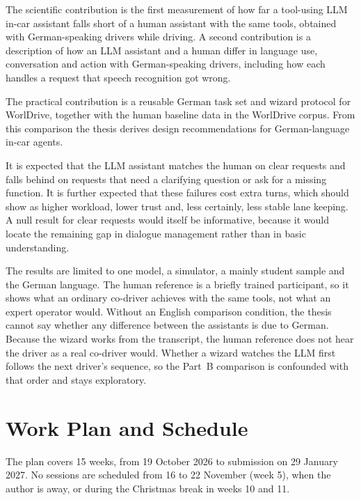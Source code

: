 \documentclass[
    a4paper,
    11pt,
    DIV=11,
    bigheadings,
    idxtotoc,
    listof=totoc,
    bibtotoc,
    halfparskip,
    cleardoubleempty,
    openright,
    oneside
]{scrartcl}
\begin{document}
The scientific contribution is the first measurement of how far a tool-using LLM in-car assistant falls short of a human assistant with the same tools, obtained with German-speaking drivers while driving.
A second contribution is a description of how an LLM assistant and a human differ in language use, conversation and action with German-speaking drivers, including how each handles a request that speech recognition got wrong.

The practical contribution is a reusable German task set and wizard protocol for WorlDrive, together with the human baseline data in the WorlDrive corpus.
From this comparison the thesis derives design recommendations for German-language in-car agents.

It is expected that the LLM assistant matches the human on clear requests and falls behind on requests that need a clarifying question or ask for a missing function.
It is further expected that these failures cost extra turns, which should show as higher workload, lower trust and, less certainly, less stable lane keeping.
A null result for clear requests would itself be informative, because it would locate the remaining gap in dialogue management rather than in basic understanding.

The results are limited to one model, a simulator, a mainly student sample and the German language.
The human reference is a briefly trained participant, so it shows what an ordinary co-driver achieves with the same tools, not what an expert operator would.
Without an English comparison condition, the thesis cannot say whether any difference between the assistants is due to German.
Because the wizard works from the transcript, the human reference does not hear the driver as a real co-driver would.
Whether a wizard watches the LLM first follows the next driver's sequence, so the Part~B comparison is confounded with that order and stays exploratory.

\section{Work Plan and Schedule}

The plan covers 15 weeks, from 19 October 2026 to submission on 29 January 2027.
No sessions are scheduled from 16 to 22 November (week 5), when the author is away, or during the Christmas break in weeks 10 and 11.
\end{document}
